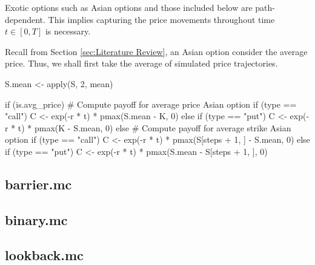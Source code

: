 Exotic options such as Asian options and those included below are path-dependent. This implies capturing the price movements throughout time $t\in[0,T]$ is necessary.

Recall from Section \ref{sec:Literature Review}, an Asian option consider the average price. Thus, we shall first take the average of simulated price trajectories.

\begin{Rminted}
S.mean <- apply(S, 2, mean)
\end{Rminted}

\begin{Rminted}
if (is.avg_price) { # Compute payoff for average price Asian option
    if (type == "call") {
        C <- exp(-r * t) * pmax(S.mean - K, 0)
    } else if (type == "put") {
        C <- exp(-r * t) * pmax(K - S.mean, 0)
    }
} else { # Compute payoff for average strike Asian option
    if (type == "call") {
        C <- exp(-r * t) * pmax(S[steps + 1, ] - S.mean, 0)
    } else if (type == "put") {
        C <- exp(-r * t) * pmax(S.mean - S[steps + 1, ], 0)
    }
}
\end{Rminted}

\subsection{barrier.mc}

\subsection{binary.mc}

\subsection{lookback.mc}

\newpage